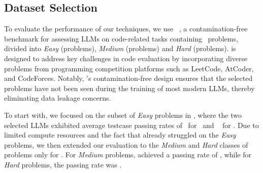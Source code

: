 


\subsection{Dataset Selection}\label{sec:dataset}
To evaluate the performance of our techniques, we use \livecodebench~\cite{livecodebench}, a contamination-free benchmark for assessing LLMs on code-related tasks
containing \totalProbsComb~problems, divided into \emph{Easy} (\totalProbs problems), \emph{Medium} (\totalProbsMedium problems) and \emph{Hard} (\totalProbsHard problems). 
\livecodebench is designed to address key challenges in code evaluation by incorporating diverse problems from programming competition platforms such as LeetCode, AtCoder, and CodeForces. 
Notably, \livecodebench's contamination-free design ensures that the selected problems have not been seen during the training of most modern LLMs, thereby eliminating data leakage concerns. 


To start with, we focused on the subset of \emph{Easy} problems in \livecodebench, where the two selected LLMs exhibited average testcase passing rates of
\SFSolutionsPassRate~for \codegenmonoC~and \GPTSolutionsPassRateSmall~ for \gptturbo.
Due to limited compute resources and the fact that \codegenmonoC already struggled on the \emph{Easy} problems, 
we then extended our evaluation to the \emph{Medium} and \emph{Hard} classes of problems only for \gptturbo. %
For \emph{Medium} problems, \gptturbo achieved a passing rate of \GPTSolutionsPassRateMedium, while for \emph{Hard} problems, the passing rate was \GPTSolutionsPassRateHard.

